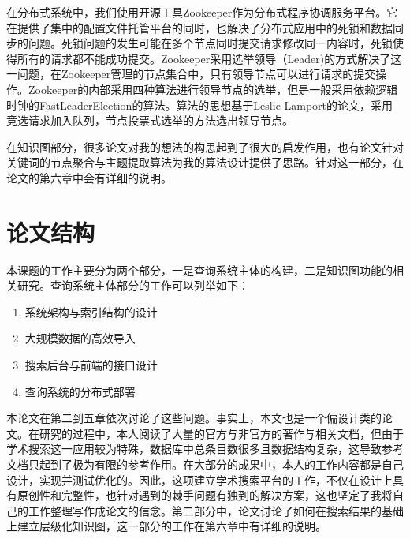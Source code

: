在分布式系统中，我们使用开源工具Zookeeper作为分布式程序协调服务平台。它在提供了集中的配置文件托管平台的同时，也解决了分布式应用中的死锁和数据同步的问题。死锁问题的发生可能在多个节点同时提交请求修改同一内容时，死锁使得所有的请求都不能成功提交。Zookeeper采用选举领导（Leader)的方式解决了这一问题，在Zookeeper管理的节点集合中，只有领导节点可以进行请求的提交操作。Zookeeper的内部采用四种算法进行领导节点的选举，但是一般采用依赖逻辑时钟的FastLeaderElection的算法。算法的思想基于Leslie Lamport的论文，采用竞选请求加入队列，节点投票式选举的方法选出领导节点。

在知识图部分，很多论文对我的想法的构思起到了很大的启发作用，也有论文针对关键词的节点聚合与主题提取算法为我的算法设计提供了思路。针对这一部分，在论文的第六章中会有详细的说明。

\section{论文结构}
本课题的工作主要分为两个部分，一是查询系统主体的构建，二是知识图功能的相关研究。查询系统主体部分的工作可以列举如下：

\begin{enumerate}
  \item 系统架构与索引结构的设计
  \item 大规模数据的高效导入
  \item 搜索后台与前端的接口设计
  \item 查询系统的分布式部署
\end{enumerate}

本论文在第二到五章依次讨论了这些问题。事实上，本文也是一个偏设计类的论文。在研究的过程中，本人阅读了大量的官方与非官方的著作与相关文档，但由于学术搜索这一应用较为特殊，数据库中总条目数很多且数据结构复杂，这导致参考文档只起到了极为有限的参考作用。在大部分的成果中，本人的工作内容都是自己设计，实现并测试优化的。因此，这项建立学术搜索平台的工作，不仅在设计上具有原创性和完整性，也针对遇到的棘手问题有独到的解决方案，这也坚定了我将自己的工作整理写作成论文的信念。第二部分中，论文讨论了如何在搜索结果的基础上建立层级化知识图，这一部分的工作在第六章中有详细的说明。